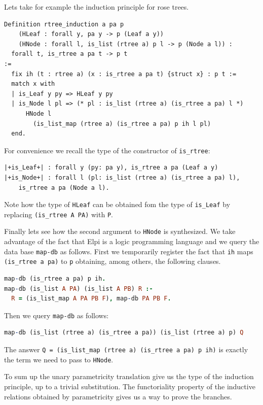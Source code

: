 \documentclass[sigplan,10pt,review]{acmart}\settopmatter{printfolios=true,printccs=false,printacmref=false}
\begin{document}
Lets take for example the induction principle for rose trees.

\begin{lstlisting}
Definition rtree_induction a pa p  
    (HLeaf : forall y, pa y -> p (Leaf a y))
    (HNode : forall l, is_list (rtree a) p l -> p (Node a l)) :
  forall t, is_rtree a pa t -> p t
:=
  fix ih (t : rtree a) (x : is_rtree a pa t) {struct x} : p t :=
  match x with
  | is_Leaf y py => HLeaf y py
  | is_Node l pl => (* pl : is_list (rtree a) (is_rtree a pa) l *)
      HNode l
        (is_list_map (rtree a) (is_rtree a pa) p ih l pl)
  end.
\end{lstlisting}

For convenience we recall the type of the constructor of
\lstinline+is_rtree+:

\begin{lstlisting}
|+is_Leaf+| : forall y (py: pa y), is_rtree a pa (Leaf a y)
|+is_Node+| : forall l (pl: is_list (rtree a) (is_rtree a pa) l),
    is_rtree a pa (Node a l).
\end{lstlisting}

Note how the type of \lstinline+HLeaf+ can be obtained fom the
type of \lstinline+is_Leaf+ by replacing \lstinline+(is_rtree A PA)+
with \lstinline+P+.

Finally lets see  how the second argument to \lstinline+HNode+ is
synthesized.  We take advantage of the fact that Elpi is a logic
programming language and we query the data base \lstinline+map-db+
as follows. First we temporarily register 
the fact that \lstinline+ih+ maps
\lstinline+(is_rtree a pa)+ to \lstinline+p+ obtaining, among others,
the following clauses.

\begin{lstlisting}[language=Prolog]
map-db (is_rtree a pa) p ih.
map-db (is_list A PA) (is_list A PB) R :-
  R = (is_list_map A PA PB F), map-db PA PB F.
\end{lstlisting}

Then we query \lstinline+map-db+ as follows:

\begin{lstlisting}[language=Prolog]
map-db (is_list (rtree a) (is_rtree a pa)) (is_list (rtree a) p) Q
\end{lstlisting}

The answer \lstinline+Q = (is_list_map (rtree a) (is_rtree a pa) p ih)+
is exactly the term we need to pass to \lstinline+HNode+.

To sum up the unary parametricity translation give us the type
of the induction principle, up to a trivial substitution.
The functoriality property of the inductive relations obtained by
parametricity gives us a way to prove the branches.
\end{document}
